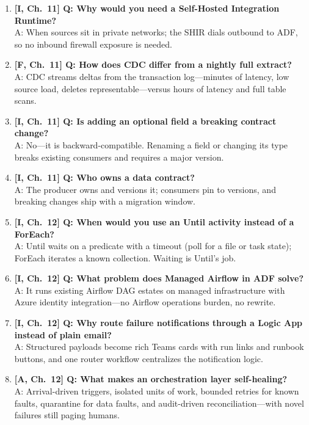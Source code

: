 \begin{enumerate}
    A: Parameterize endpoints, paths, and environment names; keep one artifact set and swap parameter files per environment.
    \item \textbf{[I, Ch.~11] Q: Why would you need a Self-Hosted Integration Runtime?}\\
    A: When sources sit in private networks; the SHIR dials outbound to ADF, so no inbound firewall exposure is needed.
    \item \textbf{[F, Ch.~11] Q: How does CDC differ from a nightly full extract?}\\
    A: CDC streams deltas from the transaction log---minutes of latency, low source load, deletes representable---versus hours of latency and full table scans.
    \item \textbf{[I, Ch.~11] Q: Is adding an optional field a breaking contract change?}\\
    A: No---it is backward-compatible. Renaming a field or changing its type breaks existing consumers and requires a major version.
    \item \textbf{[I, Ch.~11] Q: Who owns a data contract?}\\
    A: The producer owns and versions it; consumers pin to versions, and breaking changes ship with a migration window.
    \item \textbf{[I, Ch.~12] Q: When would you use an Until activity instead of a ForEach?}\\
    A: Until waits on a predicate with a timeout (poll for a file or task state); ForEach iterates a known collection. Waiting is Until's job.
    \item \textbf{[I, Ch.~12] Q: What problem does Managed Airflow in ADF solve?}\\
    A: It runs existing Airflow DAG estates on managed infrastructure with Azure identity integration---no Airflow operations burden, no rewrite.
    \item \textbf{[I, Ch.~12] Q: Why route failure notifications through a Logic App instead of plain email?}\\
    A: Structured payloads become rich Teams cards with run links and runbook buttons, and one router workflow centralizes the notification logic.
    \item \textbf{[A, Ch.~12] Q: What makes an orchestration layer self-healing?}\\
    A: Arrival-driven triggers, isolated units of work, bounded retries for known faults, quarantine for data faults, and audit-driven reconciliation---with novel failures still paging humans.
\end{enumerate}

